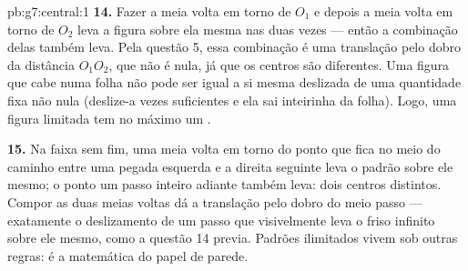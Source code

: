 \begin{solution}{pb:g7:central:1}
\textbf{14.} Fazer a meia volta em torno de $O_1$ e depois a meia volta
em torno de $O_2$ leva a figura sobre ela mesma nas duas vezes ---
então a combinação delas também leva. Pela questão 5, essa combinação é
uma translação pelo dobro da distância $O_1 O_2$, que não é nula, já
que os centros são diferentes. Uma figura que cabe numa folha não pode
ser igual a si mesma deslizada de uma quantidade fixa não nula
(deslize-a vezes suficientes e ela sai inteirinha da folha). Logo, uma
figura limitada tem no máximo um .

\textbf{15.} Na faixa sem fim, uma meia volta em torno do ponto que
fica no meio do caminho entre uma pegada esquerda e a direita seguinte
leva o padrão sobre ele mesmo; o ponto um passo inteiro adiante também
leva: dois centros distintos. Compor as duas meias voltas dá a
translação pelo dobro do meio passo --- exatamente o deslizamento de um
passo que visivelmente leva o friso infinito sobre ele mesmo, como a
questão 14 previa. Padrões ilimitados vivem sob outras regras: é a
matemática do papel de parede.
\end{solution}
